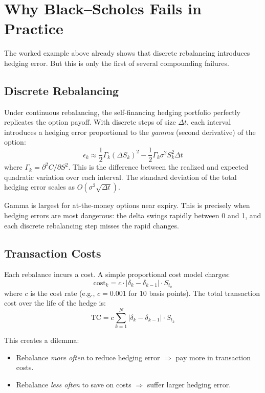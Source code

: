 \documentclass[11pt, a4paper]{article}
\theoremstyle{definition}
\theoremstyle{plain}
\theoremstyle{remark}
\begin{document}
\section{Why Black--Scholes Fails in Practice}
\label{sec:bs-failures}

The worked example above already shows that discrete rebalancing introduces hedging error.
But this is only the first of several compounding failures.

\subsection{Discrete Rebalancing}

Under continuous rebalancing, the self-financing hedging portfolio perfectly replicates
the option payoff.
With discrete steps of size $\Delta t$, each interval introduces a hedging error
proportional to the \emph{gamma} (second derivative) of the option:
\[
    \epsilon_k \approx \frac{1}{2}\Gamma_k (\Delta S_k)^2 - \frac{1}{2}\Gamma_k \sigma^2 S_k^2 \Delta t
\]
where $\Gamma_k = \partial^2 C / \partial S^2$.
This is the difference between the realized and expected quadratic variation
over each interval.
The standard deviation of the total hedging error scales as $O(\sigma^2 \sqrt{\Delta t})$.

\begin{warningbox}
Gamma is largest for at-the-money options near expiry.
This is precisely when hedging errors are most dangerous:
the delta swings rapidly between 0 and 1,
and each discrete rebalancing step misses the rapid changes.
\end{warningbox}

\subsection{Transaction Costs}

Each rebalance incurs a cost.
A simple proportional cost model charges:
\[
    \text{cost}_k = c \cdot |\delta_{k} - \delta_{k-1}| \cdot S_{t_k}
\]
where $c$ is the cost rate (e.g., $c = 0.001$ for 10 basis points).
The total transaction cost over the life of the hedge is:
\[
    \text{TC} = c \sum_{k=1}^{N} |\delta_k - \delta_{k-1}| \cdot S_{t_k}
\]

This creates a dilemma:
\begin{itemize}
    \item Rebalance \emph{more often} to reduce hedging error $\Rightarrow$ pay more in transaction costs.
    \item Rebalance \emph{less often} to save on costs $\Rightarrow$ suffer larger hedging error.
\end{itemize}
\end{document}
